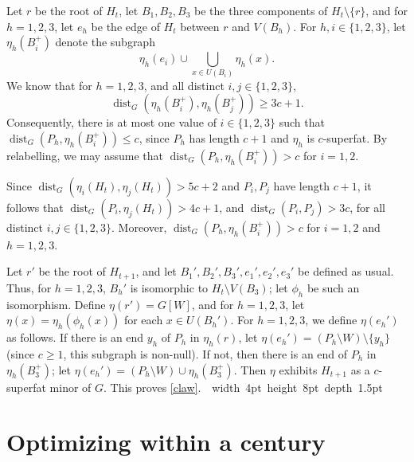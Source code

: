 \documentclass[titlepage,11pt]{article}
\newcommand\blackslug{\hbox{\hskip 1pt \vrule width 4pt height 8pt depth 1.5pt
		\hskip 1pt}}
\newcommand\bbox{\hfill \quad \blackslug \bigbreak}
\newcommand{\dist}{\operatorname{dist}}
\begin{document}
	Let $r$ be the root of $H_t$, let $B_1,B_2,B_3$ be the three components of $H_t\setminus \{r\}$, and for $h = 1,2,3$, let $e_h$ be the
	edge of $H_t$ between $r$ and $V(B_h)$. For $h,i\in \{1,2,3\}$, let $\eta_h(B_i^+)$ denote the subgraph
	$$\eta_h(e_i) \cup \bigcup_{x\in U(B_i)}\eta_h(x).$$
	We know that for $h = 1,2,3$, and all distinct $i,j\in \{1,2,3\}$,
	$$\dist_G(\eta_h(B_i^+), \eta_h(B_j^+))\ge 3c+1.$$
	Consequently, there is at most one value of $i\in \{1,2,3\}$ such that $\dist_G(P_h, \eta_h(B_i^+))\le c$, since
	$P_h$ has length $c+1$ and $\eta_h$ is $c$-superfat. By relabelling, we may assume that $\dist_G(P_h, \eta_h(B_i^+))>c$ for $i = 1,2$.
	
	Since $\dist_G(\eta_i(H_t), \eta_j(H_t))> 5c+2$ and $P_i,P_j$ have length $c+1$, it follows that
	$\dist_G(P_i, \eta_j(H_t))> 4c+1$, and $\dist_G(P_i, P_j)> 3c$, for all distinct $i,j\in \{1,2,3\}$. Moreover,
	$\dist_G(P_h, \eta_h(B_i^+))> c$ for $i = 1,2$ and $h = 1,2,3$.
	
	Let $r'$ be the root of $H_{t+1}$, and let $B_1',B_2',B_3', e_1', e_2', e_3'$
	be defined as usual. Thus, for $h = 1,2,3$,  $B_h'$ is isomorphic to $H_t\setminus V(B_3)$; let $\phi_h$ be such an isomorphism.
	Define $\eta(r') = G[W]$,
	and for $h = 1,2,3$, let $\eta(x) = \eta_h(\phi_h(x))$
	for each $x\in U(B_h')$. For $h = 1,2,3$, we define $\eta(e_h')$ as follows. If there is an end $y_h$ of $P_h$ in $\eta_h(r)$,
	let $\eta(e_h') = (P_h\setminus W)\setminus \{y_h\}$ (since $c\ge 1$, this subgraph is non-null).
	If not, then there is an end of $P_h$ in $\eta_h(B_3^+)$; let
	$\eta(e_h') = (P_h\setminus W)\cup \eta_h(B_3^+)$. Then
	$\eta$ exhibits $H_{t+1}$ as a $c$-superfat minor of $G$. This proves \ref{claw}.~\bbox
	
	
	\section{Optimizing within a century}
	
\end{document}
